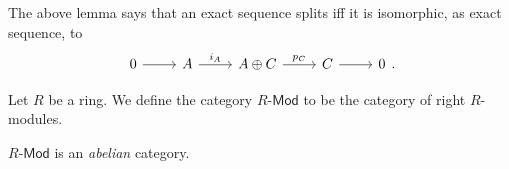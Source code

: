 \documentclass[../Main]{subfiles}
\begin{document}
\begin{rem}[]
	The above lemma says that an exact sequence splits iff
	it is isomorphic, as exact sequence, to
	\begin{equation}
	\begin{tikzcd}
		0 \arrow[r, "", rightarrow] &
		A \arrow[r, "i_A", rightarrow] &
		A \oplus C \arrow[r, "p_C", rightarrow] &
		C \arrow[r, "", rightarrow] &
		0
	\end{tikzcd}
	.\end{equation} 
\end{rem}

\begin{defn}[]
	Let $R$ be a ring. We define the category
	$R\text{-}\mathsf{Mod}$ to be the category of right $R$-modules.
\end{defn}

\begin{rem}[]
	$R\text{-}\mathsf{Mod}$ is an {\em abelian} category.
\end{rem}
\end{document}
